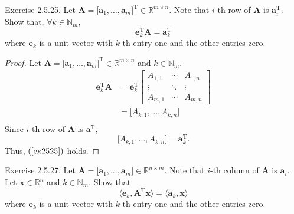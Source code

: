 \documentclass{article}
\theoremstyle{plain}
\begin{document}
\begin{itembox}[l]{Exercise 2.5.25.}
	Let
	\begin{math}
		\bm{A} = \lbrack \bm{a}_1 , \ldots , \bm{a}_m \rbrack^\mathrm{T} \in \mathbb{R}^{m \times n} .
	\end{math}
	Note that $i$-th row of $\bm{A}$ is $\bm{a}_i^\mathrm{T}$. Show that,
	\begin{math}
		\forall k \in \mathbb{N}_m,
	\end{math}
	\begin{equation}
		\label{ex2525}
		\bm{e}_k^\mathrm{T} \bm{A} = \bm{a}_k^\mathrm{T}
	\end{equation}
	where $\bm{e}_k$ is a unit vector with $k$-th entry one and the other entries zero.
\end{itembox}

\begin{proof}
	Let
	\begin{math}
		\bm{A} = \lbrack \bm{a}_1 , \ldots , \bm{a}_m \rbrack^\mathrm{T} \in \mathbb{R}^{m \times n}
	\end{math}
	and
	\begin{math}
		k \in \mathbb{N}_m .
	\end{math}
	\begin{equation*}
		\begin{split}
			\bm{e}_k^\mathrm{T} \bm{A} &=
			\bm{e}_k^\mathrm{T}
			\begin{bmatrix}
				A_{1,1} & \cdots & A_{1,n} \\
				\vdots & \ddots & \vdots \\
				A_{m,1} & \cdots & A_{m,n}
			\end{bmatrix} \\
			&= \lbrack A_{k,1} , \ldots , A_{k,n} \rbrack \\
		\end{split}
	\end{equation*}
	Since $i$-th row of $\bm{A}$ is $\bm{a}^\mathrm{T}$,
	\begin{equation*}
		\lbrack A_{k,1} , \ldots , A_{k,n} \rbrack = \bm{a}_k^\mathrm{T} .
	\end{equation*}
	Thus, $(\ref{ex2525})$ holds.
\end{proof}

\begin{itembox}[l]{Exercise 2.5.27.}
	Let
	\begin{math}
		\bm{A} = \lbrack \bm{a}_1 , \ldots , \bm{a}_m \rbrack \in \mathbb{R}^{n \times m} .
	\end{math}
	Note that $i$-th column of $\bm{A}$ is $\bm{a}_i$. Let $\bm{x} \in \mathbb{R}^n$ and $k \in \mathbb{N}_m$. Show that
	\begin{equation}
		\langle \bm{e}_k , \bm{A}^\mathrm{T} \bm{x} \rangle = \langle \bm{a}_k , \bm{x} \rangle
	\end{equation}
	where $\bm{e}_k$ is a unit vector with $k$-th entry one and the other entries zero.
\end{itembox}
\end{document}

